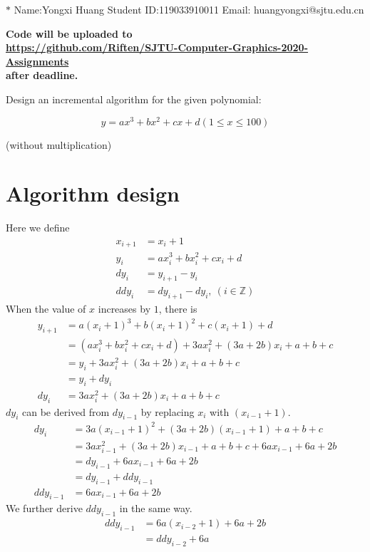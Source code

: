 \documentclass[12pt,a4paper]{article}
\theoremstyle{definition}
\numberwithin{equation}{section}
\numberwithin{figure}{section}
\begin{document}
\noindent

\noindent{}
\begin{center}

\footnotesize{\color{blue}$*$ Name:Yongxi Huang  \quad Student ID:119033910011 \quad Email: huangyongxi@sjtu.edu.cn}
\end{center}

\noindent\textbf{Code will be uploaded to \\
	\url{https://github.com/Riften/SJTU-Computer-Graphics-2020-Assignments}\\
	 after deadline.}

Design an incremental algorithm for the given polynomial:

\begin{equation*}
y=ax^3+bx^2+cx+d(1\leq x \leq 100)
\end{equation*}
\begin{center}
(without multiplication)	
\end{center}

\section{Algorithm design}
Here we define
\begin{align*}
x_{i+1}&=x_i+1\\
y_i &= ax_i^3+bx_i^2+cx_i+d\\
dy_i &= y_{i+1}-y_i\\
ddy_i &=dy_{i+1} - dy_i,~(i\in \mathbb{Z})
\end{align*}
When the value of $x$ increases by $1$, there is
\begin{align}
y_{i+1} &= a(x_i+1)^3 + b(x_i+1)^2+ c(x_i+1)+d\nonumber\\
&=(ax_i^3+bx_i^2+cx_i+d)+3ax_i^2+(3a+2b)x_i+a+b+c\nonumber\\
&=y_i+3ax_i^2+(3a+2b)x_i+a+b+c\nonumber\\
&=y_i+dy_i\label{eq1}\\
dy_i &= 3ax_i^2+(3a+2b)x_i+a+b+c\nonumber
\end{align}
$dy_i$ can be derived from $dy_{i-1}$ by replacing $x_i$ with $(x_{i-1}+1)$.
\begin{align}
dy_i &= 3a(x_{i-1}+1)^2 + (3a+2b)(x_{i-1}+1)+a+b+c\nonumber\\
&=3ax_{i-1}^2+(3a+2b)x_{i-1}+a+b+c+6ax_{i-1}+6a+2b\nonumber\\
&=dy_{i-1}+6ax_{i-1}+6a+2b\nonumber\\
&=dy_{i-1}+ddy_{i-1}\label{eq2}\\
ddy_{i-1} &= 6ax_{i-1}+6a+2b\nonumber
\end{align}
We further derive $ddy_{i-1}$ in the same way.
\begin{align}
ddy_{i-1} &= 6a(x_{i-2}+1)+6a+2b\nonumber\\
&=ddy_{i-2}+6a\label{eq3}
\end{align}
\end{document}
